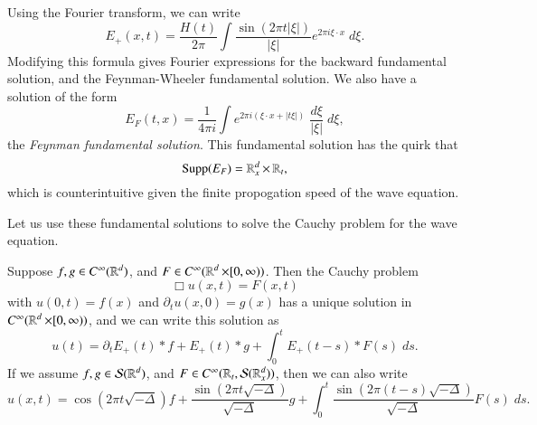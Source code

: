 Using the Fourier transform, we can write
%
\[ E_+(x,t) = \frac{H(t)}{2 \pi} \int \frac{\sin(2 \pi t |\xi|)}{|\xi|} e^{2 \pi i \xi \cdot x}\; d\xi. \]
%
Modifying this formula gives Fourier expressions for the backward fundamental solution, and the Feynman-Wheeler fundamental solution. We also have a solution of the form
%
\[ E_F(t,x) = \frac{1}{4 \pi i} \int e^{2 \pi i (\xi \cdot x + |t \xi|)}\; \frac{d\xi}{|\xi|}\; d\xi, \]
%
the \emph{Feynman fundamental solution}. This fundamental solution has the quirk that
%
\[ \text{Supp}(E_F) = \operatorname{\mathbb{R}}^d_x \times \operatorname{\mathbb{R}}_t, \]
%
which is counterintuitive given the finite propogation speed of the wave equation.

Let us use these fundamental solutions to solve the Cauchy problem for the wave equation.

\begin{theorem}
    Suppose $f,g \in C^\infty(\operatorname{\mathbb{R}}^d)$, and $F \in C^\infty(\operatorname{\mathbb{R}}^d \times [0,\infty))$. Then the Cauchy problem
    \[ \Box u(x,t) = F(x,t) \]
    with $u(0,t) = f(x)$ and $\partial_t u(x,0) = g(x)$ has a unique solution in $C^\infty(\operatorname{\mathbb{R}}^d \times [0,\infty))$, and we can write this solution as
    \[ u(t) = \partial_t E_+(t) * f + E_+(t) * g + \int_0^t E_+(t-s) * F(s)\; ds. \]
    If we assume $f,g \in \mathcal{S}(\operatorname{\mathbb{R}}^d)$, and $F \in C^\infty(\operatorname{\mathbb{R}}_t, \mathcal{S}(\operatorname{\mathbb{R}}^d_x))$, then we can also write
    \[ u(x,t) = \cos(2 \pi t \sqrt{-\Delta}) f + \frac{\sin(2 \pi t \sqrt{-\Delta})}{\sqrt{-\Delta}} g + \int_0^t \frac{\sin(2 \pi (t - s) \sqrt{-\Delta})}{\sqrt{-\Delta}} F(s)\; ds. \]
\end{theorem}
